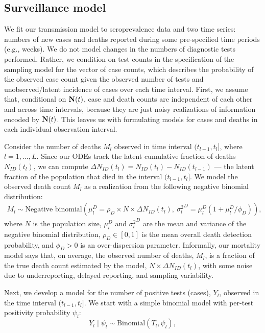 \subsection{Surveillance model}
We fit our transmission model to seroprevalence data and two time series: numbers of new cases and deaths reported during some pre-specified time periods (e.g., weeks).
We do not model changes in the numbers of diagnostic tests performed.
Rather, we condition on test counts in the specification of the sampling model for the vector of case counts, which describes the probability of the observed case count given the observed number of tests and unobserved/latent incidence of cases over each time interval.
First, we assume that, conditional on $\mathbf{N}(t)$, case and death counts are independent of each other and across time intervals, because they are just noisy realizations of information encoded by $\mathbf{N}(t)$.
This leaves us with formulating models for cases and deaths in each individual observation interval.
\par
Consider the number of deaths $M_l$ observed in time interval $(t_{l-1}, t_l]$, where $l = 1,\dots, L$.
Since our ODEs track the latent cumulative fraction of deaths $N_{I D}(t_l)$, we can compute
$\Delta N_{I D}(t_l) = N_{I D}(t_l) - N_{I D}(t_{l-1})$ --- the latent fraction of the population that died in the interval $(t_{l-1}, t_l]$.
We model the observed death count $M_l$ as a realization from the following negative binomial distribution:
\begin{align}
\label{ch_4:eqn:mortalityemission}
M_l \sim \text{Negative binomial}\left (\mu^D_l =  \rho_D \times N \times \Delta N_{I D}(t_l),\ {\sigma^2_l}^D = \mu^D_l (1 + \mu^D_l / \phi_D )\right ),
\end{align}
where $N$ is the population size, $ \mu^D_l $ and $ {\sigma^2_l}^D $ are the mean and variance of the negative binomial distribution, $ \rho_D \in [0,1]$ is the mean overall death detection probability, and $ \phi_D > 0 $ is an over-dispersion parameter.
Informally, our mortality model says that, on average, the observed number of deaths, $ M_l $, is a fraction of the true death count estimated by the model, $N \times \Delta N_{I D}(t_l)$,  with some noise due to underreporting, delayed reporting, and sampling variability.
\par
Next, we develop a model for the number of positive tests (cases), $Y_l$, observed in the time interval $(t_{l-1}, t_l]$.
We start with a simple binomial model with per-test positivity probability $\psi_l$:
\[
Y_l \mid \psi_l \sim \text{Binomial}(T_l, \psi_l),
\]
